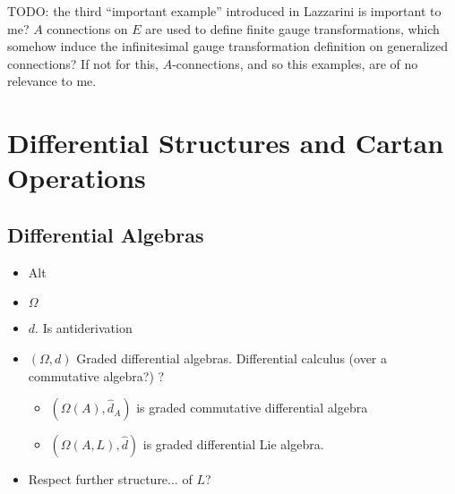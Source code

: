 TODO: the third ``important example'' introduced in Lazzarini is important to me? $A$ connections on $E$ are used to define finite gauge transformations, which somehow induce the infinitesimal gauge transformation definition on generalized connections? If not for this, $A$-connections, and so this examples, are of no relevance to me.

\section{Differential Structures and Cartan Operations}

\subsection{Differential Algebras}

{\color{gray}
\begin{itemize}

\item Alt

\item $\Omega$

\item $d$. Is antiderivation

\item $(\Omega, d)$ Graded differential algebras. Differential calculus (over a commutative algebra?) ?
    
    \begin{itemize}
    
    \item $(\Omega(A), \hat d_A)$ is graded commutative differential algebra
    
    \item $(\Omega(A, L), \hat d)$ is graded differential Lie algebra.
    
    \end{itemize}

\item Respect further structure... of $L$?



\end{itemize}
}

